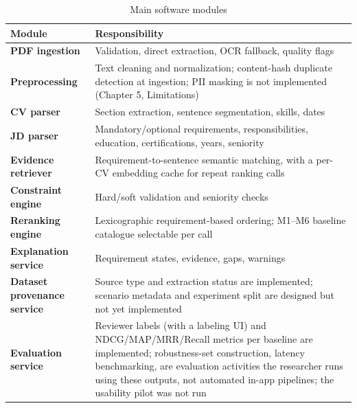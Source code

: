 \documentclass[12pt,a4paper,oneside]{report}
\begin{document}
\begin{table}[htbp]
\centering
\caption{Main software modules}
\label{tab:modules}
\begin{tabularx}{\textwidth}{>{\bfseries}p{}X}
\toprule
Module & Responsibility \\
\midrule
PDF ingestion & Validation, direct extraction, OCR fallback, quality flags \\
Preprocessing & Text cleaning and normalization; content-hash duplicate detection at ingestion; PII masking is not implemented (Chapter 5, Limitations) \\
CV parser & Section extraction, sentence segmentation, skills, dates \\
JD parser & Mandatory/optional requirements, responsibilities, education, certifications, years, seniority \\
Evidence retriever & Requirement-to-sentence semantic matching, with a per-CV embedding cache for repeat ranking calls \\
Constraint engine & Hard/soft validation and seniority checks \\
Reranking engine & Lexicographic requirement-based ordering; M1--M6 baseline catalogue selectable per call \\
Explanation service & Requirement states, evidence, gaps, warnings \\
Dataset provenance service & Source type and extraction status are implemented; scenario metadata and experiment split are designed but not yet implemented \\
Evaluation service & Reviewer labels (with a labeling UI) and NDCG/MAP/MRR/Recall metrics per baseline are implemented; robustness-set construction, latency benchmarking, are evaluation activities the researcher runs using these outputs, not automated in-app pipelines; the usability pilot was not run \\
\bottomrule
\end{tabularx}
\end{table}
\end{document}
